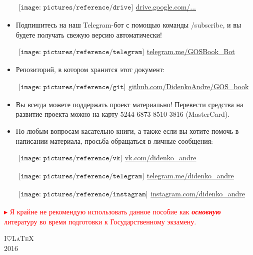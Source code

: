 \begin{flushleft}
\begin{itemize}[wide, labelwidth=!, labelindent=0pt, label=$\blacktriangleright$, noitemsep]
\qquad\href{https://docs.google.com/spreadsheets/d/10jIg9Nr5oM1-Zjo_iIlKs8uxrBKrzfuJNas_YJIIxPs/edit\#gid=0}{$
\begin{array}{l}
\texttt{[image: pictures/reference/drive]}
\end{array}
$\large drive.google.com/...}

\item Подпишитесь на наш Telegram-бот с помощью команды \textsf{/subscribe}, и вы будете получать свежую версию автоматически!

\qquad\href{https://t.me/GOSBook_Bot}{$
\begin{array}{l}
\texttt{[image: pictures/reference/telegram]}
\end{array}
$\large telegram.me/GOSBook\_Bot} 

\item Репозиторий, в котором хранится этот документ:

\qquad\href{https://github.com/DidenkoAndre/GOS_book}{$
\begin{array}{l}
\texttt{[image: pictures/reference/git]}
\end{array}
$\large github.com/DidenkoAndre/GOS\_book}

\item Вы всегда можете поддержать проект материально! 
Перевести средства на развитие проекта можно на карту {\large 5244 6873 8510 3816} \textsf{(MasterCard)}.

\item По любым вопросам касательно книги, а также если вы хотите помочь в написании материала, просьба обращаться в личные сообщения: 

\qquad\href{https://vk.com/didenko_andre}{$
\begin{array}{l}
\texttt{[image: pictures/reference/vk]}
\end{array}
$\large vk.com/didenko\_andre}

\qquad\href{https://telegram.me/didenko_andre}{$
\begin{array}{l}
\texttt{[image: pictures/reference/telegram]}
\end{array}
$\large telegram.me/didenko\_andre}

\qquad\href{https://instagram.com/didenko_andre}{$
\begin{array}{l}
\texttt{[image: pictures/reference/instagram]}
\end{array}
$\large instagram.com/didenko\_andre}
\end{itemize}

\smallskip
\vfill

\textcolor{red}{
$\blacktriangleright$ Я крайне не рекомендую использовать данное пособие как \textit{\textbf{основную}} литературу во время подготовки к Государственному экзамену.
}
\end{flushleft}

\medskip
\vfill
{\huge\scshape I\;$\heartsuit$\;\LaTeX}\\[0.5\baselineskip]
{\LARGE\scshape 2016}\par
\restoregeometry
\endgroup
\newpage